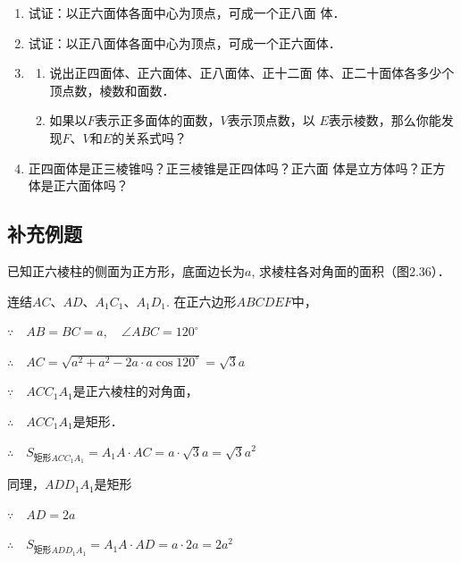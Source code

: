 \begin{ex}
\begin{enumerate}
    \item 试证：以正六面体各面中心为顶点，可成一个正八面
    体．
    \item 试证：以正八面体各面中心为顶点，可成一个正六面体．
    \item \begin{enumerate}
        \item 说出正四面体、正六面体、正八面体、正十二面
    体、正二十面体各多少个顶点数，棱数和面数．
    \item 如果以$F$表示正多面体的面数，$V$表示顶点数，以
    $E$表示棱数，那么你能发现$F$、$V$和$E$的关系式吗？
\end{enumerate}
\item 正四面体是正三棱锥吗？正三棱锥是正四体吗？正六面
    体是立方体吗？正方体是正六面体吗？
\end{enumerate}
\end{ex}

\subsection{补充例题}
\begin{example}
    已知正六棱柱的侧面为正方形，底面边长为$a$, 求棱柱各对角面的面积（图2.36）．
\end{example}

\begin{solution}
    连结$AC$、$AD$、$A_1C_1$、$A_1D_1$. 
在正六边形$ABCDEF$中，

$\because\quad AB=BC=a,\quad \angle ABC=120^{\circ}$

$\therefore\quad AC=\sqrt{a^2+a^2-2a\cdot a\cos120^{\circ}}=\sqrt{3}a$

$\because\quad ACC_1A_1$是正六棱柱的对角面，

$\therefore\quad ACC_1A_1$是矩形．

$\therefore\quad S_{\text{矩形}ACC_1A_1}=A_1A\cdot AC=a\cdot\sqrt{3}a=\sqrt{3}a^2$

同理，$ADD_1A_1$是矩形

$\because\quad AD=2a$

$\therefore\quad S_{\text{矩形}ADD_1A_1}=A_1A\cdot AD=a\cdot 2a=2a^2$
\end{solution}

